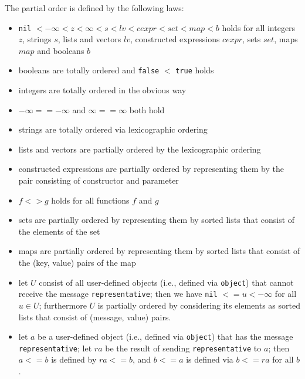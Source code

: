\documentclass[11pt]{amsart}
\newcommand{\babelsrc}[1] {\lstinline!#1!}
\begin{document}
The partial order is defined by the following laws:
\begin{itemize}
\item  \babelsrc{nil} $< -\infty <  z  < \infty < s <  lv < cexpr < set < map < b$ holds for all
 integers $z$, strings $s$,  lists and vectors $lv$,  constructed expressions $cexpr$, sets $set$, maps $map$ and booleans $b$
 \item booleans are totally ordered and \babelsrc{false} $<$ \babelsrc{true} holds
 \item integers are totally ordered in the obvious way
 \item $-\infty == -\infty$ and $\infty == \infty$ both hold 
 \item strings are totally ordered via lexicographic ordering
\item lists and vectors are partially ordered by the lexicographic ordering 
\item constructed expressions are partially ordered by representing them by the pair consisting of constructor and parameter
\item $f <> g$ holds for all functions $f$ and $g$
\item sets are partially ordered by representing them by sorted lists that consist of the elements of the set
\item maps are partially ordered by representing them by sorted lists that consist of the (key, value) pairs of the map
\item let $U$ consist of all user-defined objects  (i.e., defined via \babelsrc{object}) that cannot receive the message \texttt{representative}; then we have  \babelsrc{nil} $<= u < -\infty$  for all $u \in U$; furthermore $U$ is partially ordered by considering its elements as sorted lists that consist of (message, value) pairs.
\item let $a$ be a user-defined object  (i.e., defined via \babelsrc{object}) that has the message \texttt{representative}; let $ra$ be the result of sending  \texttt{representative} to $a$; then $a <= b$ is defined by $ra <= b$, and $b <= a$ is defined via $b <= ra$ for all $b$.
\end{itemize}
\end{document}
